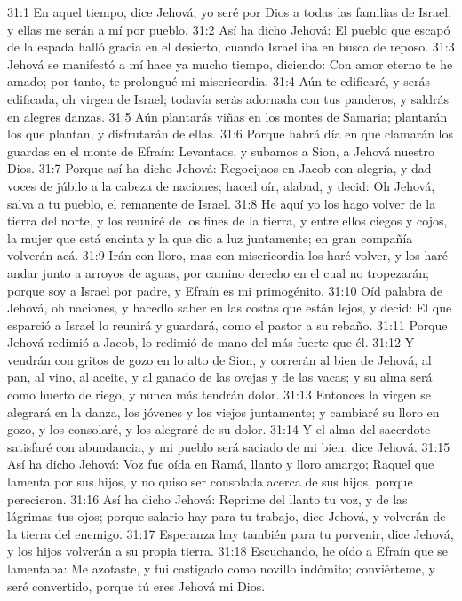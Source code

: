 31:1 En aquel tiempo, dice Jehová, yo seré por Dios a todas las familias de Israel, y ellas me serán a mí por pueblo. 
31:2 Así ha dicho Jehová: El pueblo que escapó de la espada halló gracia en el desierto, cuando Israel iba en busca de reposo. 
31:3 Jehová se manifestó a mí hace ya mucho tiempo, diciendo: Con amor eterno te he amado; por tanto, te prolongué mi misericordia. 
31:4 Aún te edificaré, y serás edificada, oh virgen de Israel; todavía serás adornada con tus panderos, y saldrás en alegres danzas. 
31:5 Aún plantarás viñas en los montes de Samaria; plantarán los que plantan, y disfrutarán de ellas. 
31:6 Porque habrá día en que clamarán los guardas en el monte de Efraín: Levantaos, y subamos a Sion, a Jehová nuestro Dios. 
31:7 Porque así ha dicho Jehová: Regocijaos en Jacob con alegría, y dad voces de júbilo a la cabeza de naciones; haced oír, alabad, y decid: Oh Jehová, salva a tu pueblo, el remanente de Israel. 
31:8 He aquí yo los hago volver de la tierra del norte, y los reuniré de los fines de la tierra, y entre ellos ciegos y cojos, la mujer que está encinta y la que dio a luz juntamente; en gran compañía volverán acá. 
31:9 Irán con lloro, mas con misericordia los haré volver, y los haré andar junto a arroyos de aguas, por camino derecho en el cual no tropezarán; porque soy a Israel por padre, y Efraín es mi primogénito. 
31:10 Oíd palabra de Jehová, oh naciones, y hacedlo saber en las costas que están lejos, y decid: El que esparció a Israel lo reunirá y guardará, como el pastor a su rebaño. 
31:11 Porque Jehová redimió a Jacob, lo redimió de mano del más fuerte que él. 
31:12 Y vendrán con gritos de gozo en lo alto de Sion, y correrán al bien de Jehová, al pan, al vino, al aceite, y al ganado de las ovejas y de las vacas; y su alma será como huerto de riego, y nunca más tendrán dolor. 
31:13 Entonces la virgen se alegrará en la danza, los jóvenes y los viejos juntamente; y cambiaré su lloro en gozo, y los consolaré, y los alegraré de su dolor. 
31:14 Y el alma del sacerdote satisfaré con abundancia, y mi pueblo será saciado de mi bien, dice Jehová. 
31:15 Así ha dicho Jehová: Voz fue oída en Ramá, llanto y lloro amargo; Raquel que lamenta por sus hijos, y no quiso ser consolada acerca de sus hijos, porque perecieron. 
31:16 Así ha dicho Jehová: Reprime del llanto tu voz, y de las lágrimas tus ojos; porque salario hay para tu trabajo, dice Jehová, y volverán de la tierra del enemigo. 
31:17 Esperanza hay también para tu porvenir, dice Jehová, y los hijos volverán a su propia tierra. 
31:18 Escuchando, he oído a Efraín que se lamentaba: Me azotaste, y fui castigado como novillo indómito; conviérteme, y seré convertido, porque tú eres Jehová mi Dios. 
